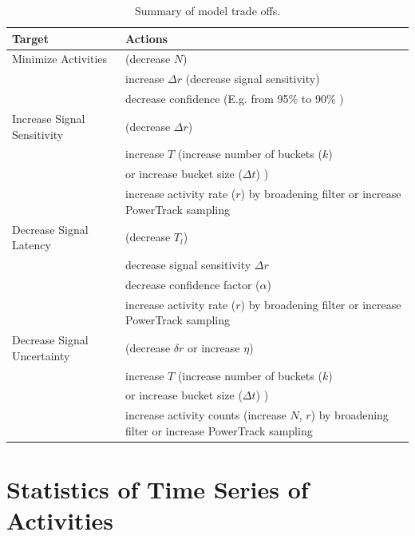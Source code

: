 \documentclass{article}
\begin{document}
\begin{table}[!h]
    \begin{tabular}{ m{4cm}| m{7cm}}
     \hline
Target  & Actions \\
\hline
Minimize Activities  & (decrease $N$)  \\
                                  & increase $\Delta r$ (decrease signal sensitivity)  \\
                                  & decrease confidence (E.g. from 95\% to 90\% )  \\
\hline	
Increase Signal Sensitivity   & (decrease $\Delta r$)  \\
                                  & increase $T$ (increase number of buckets ($k$)  \\
                                  & or increase bucket size ($\Delta t$) )  \\
                                  & increase activity rate ($r$) by broadening filter or increase PowerTrack sampling \\
\hline
Decrease Signal Latency      & (decrease $T_l$)  \\
                                 & decrease signal sensitivity $\Delta r$  \\
                                 & decrease confidence factor ($\alpha$) \\
                                 & increase activity rate ($r$) by broadening filter or increase PowerTrack sampling \\
\hline
Decrease Signal Uncertainty & (decrease $\delta r$ or increase $\eta$) \\
                          	 & increase $T$ (increase number of buckets ($k$)  \\
                                 & or increase bucket size ($\Delta t$) )  \\
                                 & increase activity counts (increase $N$, $r$) by broadening filter or increase PowerTrack sampling \\
\hline
\end{tabular}
\caption{Summary of model trade offs.}
\label{tab:tradeoff}

\end{table}



\section{Statistics of Time Series of Activities} 
\end{document}
